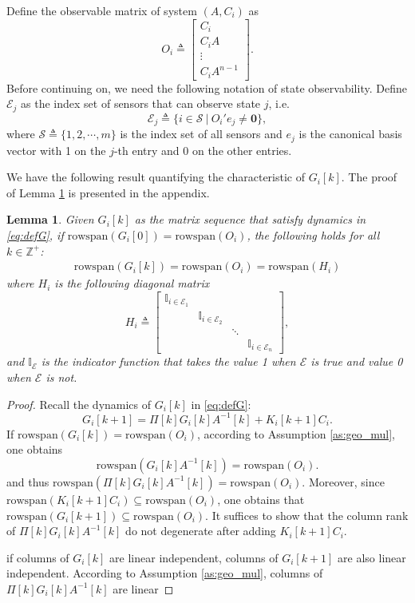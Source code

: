 \documentclass[12pt]{article}
\newcommand{\Ib}{{\mathbb{I}}}
\newcommand{\Zb}{{\mathbb{Z}}}
\newcommand{\Es}{{\mathscr{E}}}
\newcommand{\Ec}{{\mathcal{E}}} %
\newcommand{\Sc}{{\mathcal{S}}}
\newcommand{\Ss}{{\mathscr{S}}}
\newcommand{\rs}{\text{rowspan}}
\newtheorem{lemma}{\textbf{Lemma}}
\newtheorem*{proof}{\textbf{Proof}}
\begin{document}
Define the observable matrix of system $(A,C_i)$ as 
$$
O_{i} \triangleq\left[\begin{array}{c}
C_{i} \\
C_{i} A \\
\vdots \\
C_{i} A^{n-1}
\end{array}\right].
$$
Before continuing on, we need the following notation of state observability. 
Define $\Ec_j$ as the index set of sensors that can observe state $j$, i.e.
\begin{equation}\label{eq:def_Oc}
\Ec_j\triangleq \{i\in\Ss\ |\ O_i{'} e_j\neq \mathbf{0} \},
\end{equation}
where $\Ss\triangleq \{1,2,\cdots,m\}$ is the index set of all sensors and $e_j$ is the canonical basis vector with 1 on the $j$-th entry and 0 on the other entries.


We have the following result quantifying the characteristic of $G_i[k]$. The proof of Lemma \ref{lm:span} is presented in the appendix.
\begin{lemma}\label{lm:span}
	Given $G_i[k]$ as the matrix sequence that satisfy dynamics in \eqref{eq:defG}, if $\rs(G_i[0])=\rs(O_i)$, the following holds for all $k\in\Zb^+$:
	\begin{align*}
	\rs(G_i[k])=\rs(O_i)=\rs(H_i)
	\end{align*}
	where $H_i$ is the following diagonal matrix
	\begin{equation*}
	H_i\triangleq \begin{bmatrix}
	\Ib_{i\in\Ec_1} & & & \\
	&\Ib_{i\in\Ec_2} & &  \\
	& & \ddots &  \\
	& & & \Ib_{i\in\Ec_n}
	\end{bmatrix} ,
	\end{equation*}
	and $\mathbb{I}_\Es$ is the indicator function that takes the value 1 when $\Es$ is true and value 0 when $\Es$ is not.
\end{lemma}

\begin{proof}
	Recall the dynamics of $G_i[k]$ in \eqref{eq:defG}:
	 	$$G_i[k+1]=\Pi[k] G_i[k] A^{-1}[k]+K_i[k+1]C_i.$$
	If $\rs(G_i[k])= \rs(O_i)$, according to Assumption \ref{as:geo_mul}, one obtains
	$$\rs(G_i[k]A^{-1}[k])= \rs(O_i).$$
	and thus $\rs(\Pi[k]G_i[k]A^{-1}[k])= \rs(O_i).$ Moreover, since $\rs(K_i[k+1]C_i)\subseteq \rs(O_i)$, one obtains that $\rs(G_i[k+1])\subseteq \rs(O_i)$. It suffices to show that the column rank of $\Pi[k] G_i[k] A^{-1}[k]$ do not degenerate after adding $K_i[k+1]C_{i}$.
	
	if columns of $G_i[k]$ are linear independent, columns of $G_i[k+1]$ are also linear independent. According to Assumption \ref{as:geo_mul}, columns of  $\Pi[k] G_i[k] A^{-1}[k]$ are linear 
\end{proof}
\end{document}
